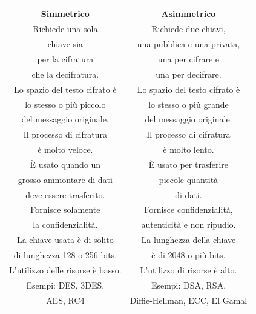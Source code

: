 \begin{tabular}{|c|c|}
	\hline
	\textbf{Simmetrico} & \textbf{Asimmetrico} \\
	\hline
	\textsf{\small Richiede una sola  } & \textsf{\small Richiede due chiavi, } \\
	\textsf{\small chiave sia} & \textsf{\small  una pubblica e una privata,} \\
	\textsf{\small per la cifratura } & \textsf{\small una per cifrare e } \\
	\textsf{\small che la decifratura.} & \textsf{\small una per decifrare.} \\ %
	\hline
	\textsf{\small Lo spazio del testo cifrato è  } & \textsf{\small Lo spazio del testo cifrato è  } \\
	\textsf{\small lo stesso o più piccolo } & \textsf{\small lo stesso o più grande } \\
	\textsf{\small del messaggio originale.} & \textsf{\small del messaggio originale.} \\
	\hline
	\textsf{\small Il processo di cifratura } & \textsf{\small Il processo di cifratura } \\
	\textsf{\small è molto veloce.} & \textsf{\small è molto lento.} \\
	\hline
	\textsf{\small È usato quando un  } & \textsf{\small È usato per trasferire } \\
	\textsf{\small grosso ammontare di dati} & \textsf{\small piccole quantità} \\
	\textsf{\small deve essere trasferito.} & \textsf{\small  di dati.} \\
	\hline
	\textsf{\small Fornisce solamente } & \textsf{\small Fornisce confidenzialità, } \\ %
	\textsf{\small la confidenzialità.} & \textsf{\small autenticità e non ripudio.} \\ %
	\hline
	\textsf{\small La chiave usata è di solito } & \textsf{\small La lunghezza della chiave } \\
	\textsf{\small di lunghezza 128 o 256 bits.} & \textsf{\small è di 2048 o più bits.} \\
	\hline
	\textsf{\small L'utilizzo delle risorse è basso.} & \textsf{\small L'utilizzo di risorse è alto.} \\
	\hline
	\textsf{\small Esempi: DES, 3DES, } & \textsf{\small Esempi: DSA, RSA, } \\
	\textsf{\small AES, RC4} & \textsf{\small Diffie-Hellman, ECC, El Gamal} \\
	\hline
\end{tabular}

